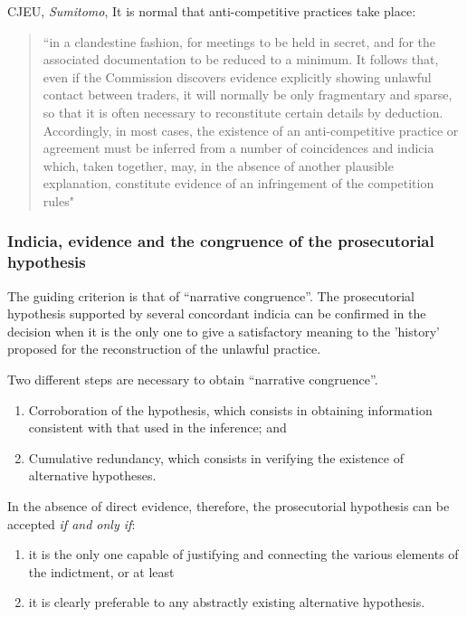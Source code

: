             \newpage

            CJEU, \textit{Sumitomo}, It is normal that anti-competitive practices take place:

            \begin{quote}
                 “in a clandestine fashion, for meetings to be held in secret, and for the associated documentation to be reduced to a minimum. It follows that, even if the Commission discovers evidence explicitly showing unlawful contact between traders, it will normally be only fragmentary and sparse, so that it is often necessary to reconstitute certain details by deduction. Accordingly, in most cases, the existence of an anti-competitive practice or agreement must be inferred from a number of coincidences and indicia which, taken together, may, in the absence of another plausible explanation, constitute evidence of an infringement of the competition rules"
            \end{quote}

        \subsubsection{Indicia, evidence and the congruence of the prosecutorial hypothesis}

            The guiding criterion is that of ``narrative congruence''. The prosecutorial hypothesis supported by several concordant indicia can be confirmed in the decision when it is the only one to give a satisfactory meaning to the 'history' proposed for the reconstruction of the unlawful practice.

            Two different steps are necessary to obtain ``narrative congruence''.
            \begin{enumerate}
                \item Corroboration of the hypothesis, which consists in obtaining information consistent with that used in the inference; and
                \item Cumulative redundancy, which consists in verifying the existence of alternative hypotheses.
            \end{enumerate}
            
            In the absence of direct evidence, therefore, the prosecutorial hypothesis can be accepted \textit{if and only if}:
            \begin{enumerate}[label=\roman*.]
                \item it is the only one capable of justifying and connecting the various elements of the indictment, or at least
                \item it is clearly preferable to any abstractly existing alternative hypothesis.
            \end{enumerate}

